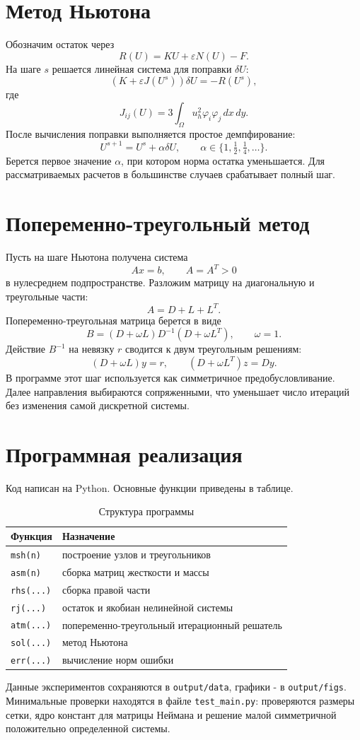 \documentclass[12pt,a4paper]{article}
\newcommand{\eps}{\varepsilon}
\newcommand{\Om}{\Omega}
\newcommand{\dd}{\,dx\,dy}
\begin{document}
\section{Метод Ньютона}

Обозначим остаток через
\[
  R(U)=KU+\eps N(U)-F.
\]
На шаге \(s\) решается линейная система для поправки \(\delta U\):
\[
  \left(K+\eps J(U^s)\right)\delta U=-R(U^s),
\]
где
\[
  J_{ij}(U)=3\int_{\Om}u_h^2\varphi_i\varphi_j\dd.
\]
После вычисления поправки выполняется простое демпфирование:
\[
  U^{s+1}=U^s+\alpha\delta U,\qquad
  \alpha\in\{1,\tfrac12,\tfrac14,\ldots\}.
\]
Берется первое значение \(\alpha\), при котором норма остатка уменьшается. Для рассматриваемых расчетов в большинстве случаев срабатывает полный шаг.

\section{Попеременно-треугольный метод}

Пусть на шаге Ньютона получена система
\[
  Ax=b,\qquad A=A^T>0
\]
в нулесреднем подпространстве. Разложим матрицу на диагональную и треугольные части:
\[
  A=D+L+L^T.
\]
Попеременно-треугольная матрица берется в виде
\[
  B=(D+\omega L)D^{-1}(D+\omega L^T),\qquad \omega=1.
\]
Действие \(B^{-1}\) на невязку \(r\) сводится к двум треугольным решениям:
\[
  (D+\omega L)y=r,\qquad
  (D+\omega L^T)z=Dy.
\]
В программе этот шаг используется как симметричное предобусловливание. Далее направления выбираются сопряженными, что уменьшает число итераций без изменения самой дискретной системы.

\section{Программная реализация}

Код написан на Python. Основные функции приведены в таблице.

\begin{table}[H]
\centering
\caption{Структура программы}
\begin{tabular}{p{}p{}}
\toprule
Функция & Назначение\\
\midrule
\texttt{msh(n)} & построение узлов и треугольников\\
\texttt{asm(n)} & сборка матриц жесткости и массы\\
\texttt{rhs(...)} & сборка правой части\\
\texttt{rj(...)} & остаток и якобиан нелинейной системы\\
\texttt{atm(...)} & попеременно-треугольный итерационный решатель\\
\texttt{sol(...)} & метод Ньютона\\
\texttt{err(...)} & вычисление норм ошибки\\
\bottomrule
\end{tabular}
\end{table}
Данные экспериментов сохраняются в \texttt{output/data}, графики - в \texttt{output/figs}. Минимальные проверки находятся в файле \texttt{test\_main.py}: проверяются размеры сетки, ядро констант для матрицы Неймана и решение малой симметричной положительно определенной системы.
\end{document}
